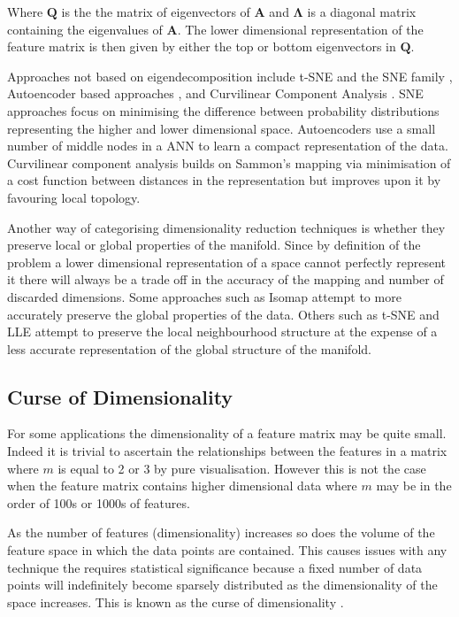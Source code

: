 Where $\bm{Q}$ is the the matrix of eigenvectors of $\bm{A}$ and $\bm{\Lambda}$ is a diagonal matrix containing the eigenvalues of $\bm{A}$. The lower dimensional representation of the feature matrix is then given by either the top or bottom eigenvectors in $\bm{Q}$.

Approaches not based on eigendecomposition include t-SNE and the SNE family \cite{van2008visualizing, hinton2002stochastic}, Autoencoder based approaches \cite{hinton2006reducing}, and Curvilinear Component Analysis \cite{demartines1997curvilinear}. SNE approaches focus on minimising the difference between probability distributions representing the higher and lower dimensional space. Autoencoders use a small number of middle nodes in a ANN to learn a compact representation of the data. Curvilinear component analysis builds on Sammon's mapping via minimisation of a cost function between distances in the representation but improves upon it by favouring local topology.

Another way of categorising dimensionality reduction techniques is whether they preserve local or global properties of the manifold. Since by definition of the problem a lower dimensional representation of a space cannot perfectly represent it there will always be a trade off in the accuracy of the mapping and number of discarded dimensions. Some approaches such as Isomap attempt to more accurately preserve the global properties of the data. Others such as t-SNE and LLE attempt to preserve the local neighbourhood structure at the expense of a less accurate representation of the global structure of the manifold.


\subsection{Curse of Dimensionality}
For some applications the dimensionality of a feature matrix may be quite small. Indeed it is trivial to ascertain the relationships between the features in a matrix where $m$ is equal to 2 or 3 by pure visualisation. However this is not the case when the feature matrix contains higher dimensional data where $m$ may be in the order of 100s or 1000s of features.

As the number of features (dimensionality) increases so does the volume of the feature space in which the data points are contained. This causes issues with any technique the requires statistical significance because a fixed number of data points will indefinitely become sparsely distributed as the dimensionality of the space increases. This is known as the curse of dimensionality \cite{bellman1965dynamic}.

